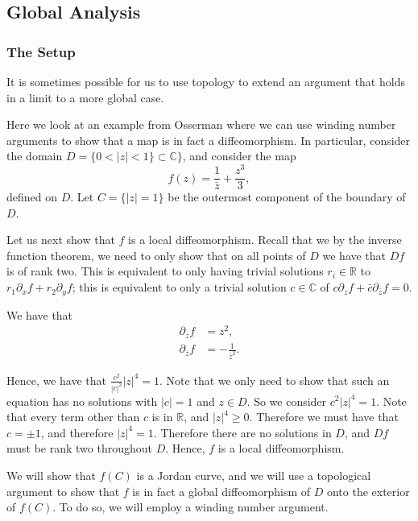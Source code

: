 \subsection{Global Analysis}
\subsubsection*{The Setup}

It is sometimes possible for us to use topology to extend an argument that holds in a limit to a more global case.

Here we look at an example from Osserman \cite{Osserman} where we can use winding number arguments to show that
a map is in fact a diffeomorphism. In particular, consider the domain \(D = \{0 < |z| < 1\} \subset \mathbb C\}\), 
and consider the map 
\begin{equation}
f(z) = \frac{1}{\bar z} + \frac{z^3}{3},
\end{equation} 
defined on \(D\). Let \(C = \{|z| = 1\}\) be the outermost component of the boundary of \(D\). 

Let us next show that \(f\) is a local diffeomorphism. Recall that we by the inverse function theorem, we need to 
only show that on all points of \(D\) we have that \(Df\) is of rank two. This is equivalent to only having
trivial solutions \(r_i \in \mathbb R\) to \(r_1\partial_x f + r_2\partial_y f\); this is equivalent to only
a trivial solution \(c\in \mathbb C\) of \(c\partial_z f + \bar c \partial_{\bar z} f = 0\). 

We have that
\begin{align}
\partial_z f & = z^2, \\
\partial_{\bar z} f & = -\frac{1}{\bar z^2}.
\end{align}

Hence, we have that \(\frac{c^2}{|c|^2} |z|^4 = 1\). Note that we only need to show that such an equation has 
no solutions with \(|c| = 1\) and \(z \in D\). So we consider \(c^2 |z|^4 = 1\). Note that every term other than
\(c\) is in \(\mathbb R\), and \(|z|^4 \geq 0\). Therefore we must have that \(c = \pm 1\), 
and therefore \(|z|^4 = 1\). Therefore there are no solutions in \(D\), and \(Df\) must be rank two 
throughout \(D\). Hence, \(f\) is a local diffeomorphism.

We will show that \(f(C)\) is a Jordan curve, and we will use a topological argument to show that \(f\)
is in fact a global diffeomorphism of \(D\) onto the exterior of \(f(C)\). To do so, we will employ
a winding number argument.


